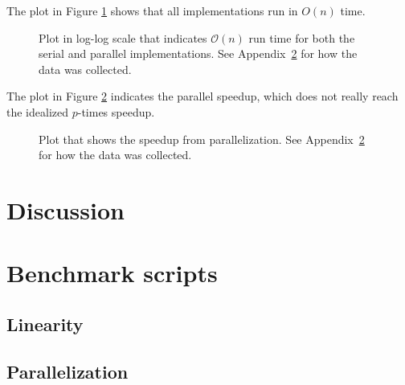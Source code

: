 \documentclass[12pt,a4paper]{article}
\begin{document}
The plot in Figure \ref{fig:linear} shows that all implementations run in
$O(n)$ time.

\begin{figure}[h]
    \begin{center}
        
        \caption{Plot in log-log scale that indicates $\mathcal{O}(n)$ run time for
        both the serial and parallel implementations. See
        Appendix~\ref{sec:appendixBenchmarkScripts} for how the data was collected.} 
        \label{fig:linear}
    \end{center}
\end{figure}

The plot in Figure \ref{fig:speedup} indicates the parallel speedup, which does
not really reach the idealized $p$-times speedup.

\begin{figure}[h]
    \begin{center}
        
        \caption{Plot that shows the speedup from parallelization. See
        Appendix~\ref{sec:appendixBenchmarkScripts} for how the data was
        collected.} 
        \label{fig:speedup}
    \end{center}
\end{figure}




\section{Discussion}



\appendix

\section{Benchmark scripts}
\label{sec:appendixBenchmarkScripts}

\subsection{Linearity}


\subsection{Parallelization}

\end{document}
